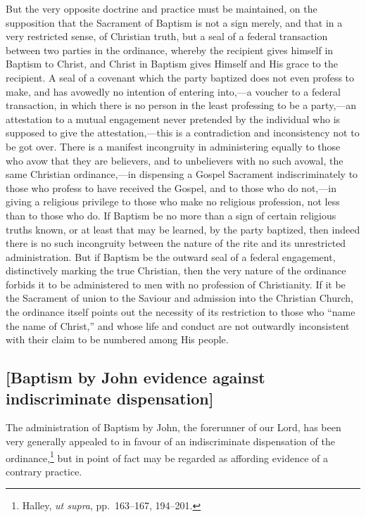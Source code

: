 \documentclass[
  english,
]{book}
\begin{document}
But the very opposite doctrine and practice must be maintained, on the supposition that the Sacrament of Baptism is not a sign merely, and that in a very restricted sense, of Christian truth, but a seal of a federal transaction between two parties in the ordinance, whereby the recipient gives himself in Baptism to Christ, and Christ in Baptism gives Himself and His grace to the recipient. A seal of a covenant which the party baptized does not even profess to make, and has avowedly no intention of entering into,---a voucher to a federal transaction, in which there is no person in the least professing to be a party,---an attestation to a mutual engagement never pretended by the individual who is supposed to give the attestation,---this is a contradiction and inconsistency not to be got over. There is a manifest incongruity in administering equally to those who avow that they are believers, and to unbelievers with no such avowal, the same Christian ordinance,---in dispensing a Gospel Sacrament indiscriminately to those who profess to have received the Gospel, and to those who do not,---in giving a religious privilege to those who make no religious profession, not less than to those who do. If Baptism be no more than a sign of certain religious truths known, or at least that may be learned, by the party baptized, then indeed there is no such incongruity between the nature of the rite and its unrestricted administration. But if Baptism be the outward seal of a federal engagement, distinctively marking the true Christian, then the very nature of the ordinance forbids it to be administered to men with no profession of Christianity. If it be the Sacrament of union to the Saviour and admission into the Christian Church, the ordinance itself points out the necessity of its restriction to those who ``name the name of Christ,'' and whose life and conduct are not outwardly inconsistent with their claim to be numbered among His people.

\hypertarget{baptism-by-john-evidence-against-indiscriminate-dispensation}{%
\subsection{{[}Baptism by John evidence against indiscriminate dispensation{]}}\label{baptism-by-john-evidence-against-indiscriminate-dispensation}}

The administration of Baptism by John, the forerunner of our Lord, has been very generally appealed to in favour of an indiscriminate dispensation of the ordinance,\footnote{Halley, \emph{ut supra}, pp.~163--167, 194--201.} but in point of fact may be regarded as affording evidence of a contrary practice.
\end{document}
